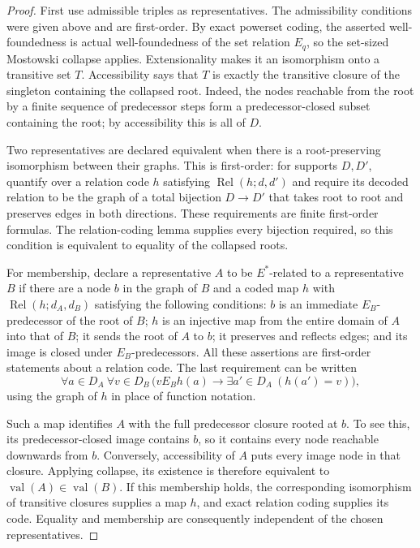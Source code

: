 \documentclass[11pt,a4paper]{article}
\numberwithin{equation}{section}
\theoremstyle{definition}
\theoremstyle{remark}
\begin{document}
\begin{proof}
First use admissible triples as representatives.  The admissibility
conditions were given above and are first-order.  By exact powerset
coding, the asserted well-foundedness is actual well-foundedness of the
set relation $E_q$, so the set-sized Mostowski collapse applies.
Extensionality makes it an isomorphism onto a transitive set $T$.
Accessibility says that $T$ is exactly the transitive closure of the
singleton containing the collapsed root.  Indeed, the nodes reachable
from the root by a finite sequence of predecessor steps form a
predecessor-closed subset containing the root; by accessibility this is
all of $D$.

Two representatives are declared equivalent when there is a root-preserving
isomorphism between their graphs.  This is first-order: for supports
$D,D'$, quantify over a relation code $h$ satisfying
$\operatorname{Rel}(h;d,d')$ and require its decoded relation to be the
graph of a total bijection $D\to D'$ that takes root to root and preserves
edges in both directions.  These requirements are finite first-order
formulas.  The relation-coding lemma supplies every bijection required,
so this condition is equivalent to equality of the collapsed roots.

For membership, declare a representative $A$ to be $E^*$-related to a
representative $B$ if there are a node $b$ in the graph of $B$ and a coded
map $h$ with $\operatorname{Rel}(h;d_A,d_B)$ satisfying the following
conditions: $b$ is an immediate
$E_B$-predecessor of the root of $B$; $h$ is an injective map from the
entire domain of $A$ into that of $B$; it sends the root of $A$ to $b$;
it preserves and reflects edges; and its image is closed under
$E_B$-predecessors.  All these assertions are first-order statements about
a relation code.  The last requirement can be written
\[
 \forall a\in D_A\ \forall v\in D_B\,
 \bigl(vE_B h(a)\longrightarrow
          \exists a'\in D_A\ (h(a')=v)\bigr),
\]
using the graph of $h$ in place of function notation.

Such a map identifies $A$ with the full predecessor closure rooted at
$b$.  To see this, its predecessor-closed image contains $b$, so it
contains every node reachable downwards from $b$.  Conversely,
accessibility of $A$ puts every image node in that closure.  Applying
collapse, its existence is therefore equivalent to
$\operatorname{val}(A)\in\operatorname{val}(B)$.  If this membership holds,
the corresponding isomorphism of transitive closures supplies a map
$h$, and exact relation coding supplies its code.  Equality and
membership are consequently independent of the chosen representatives.


\end{proof}
\end{document}
